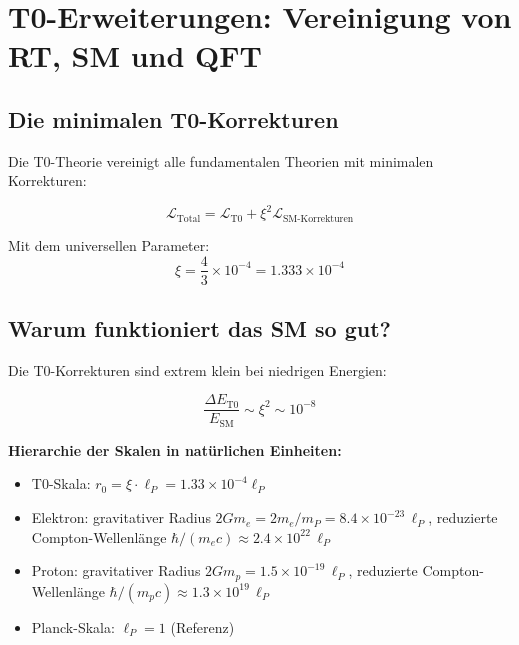 	\section{T0-Erweiterungen: Vereinigung von RT, SM und QFT}
	
	\subsection{Die minimalen T0-Korrekturen}
	
	Die T0-Theorie vereinigt alle fundamentalen Theorien mit minimalen Korrekturen:
	
	\begin{t0box}[T0-Vereinheitlichung]
		\begin{equation}
			\mathcal{L}_{\text{Total}} = \mathcal{L}_{\text{T0}} + \xi^2 \mathcal{L}_{\text{SM-Korrekturen}}
		\end{equation}
		
		Mit dem universellen Parameter:
		\begin{equation}
			\xi = \frac{4}{3} \times 10^{-4} = 1.333 \times 10^{-4}
		\end{equation}
	\end{t0box}
	
	\subsection{Warum funktioniert das SM so gut?}
	
	Die T0-Korrekturen sind extrem klein bei niedrigen Energien:
	
	\begin{equation}
		\frac{\Delta E_{\text{T0}}}{E_{\text{SM}}} \sim \xi^2 \sim 10^{-8}
	\end{equation}
	
	\textbf{Hierarchie der Skalen in natürlichen Einheiten:}
	\begin{itemize}
		\item T0-Skala: $r_0 = \xi \cdot \ell_P = 1.33 \times 10^{-4} \ell_P$
		\item Elektron: gravitativer Radius $2Gm_e = 2m_e/m_P = 8.4 \times 10^{-23}\,\ell_P$, reduzierte Compton-Wellenlänge $\hbar/(m_e c) \approx 2.4 \times 10^{22}\,\ell_P$
		\item Proton: gravitativer Radius $2Gm_p = 1.5 \times 10^{-19}\,\ell_P$, reduzierte Compton-Wellenlänge $\hbar/(m_p c) \approx 1.3 \times 10^{19}\,\ell_P$
		\item Planck-Skala: $\ell_P = 1$ (Referenz)
	\end{itemize}
	
